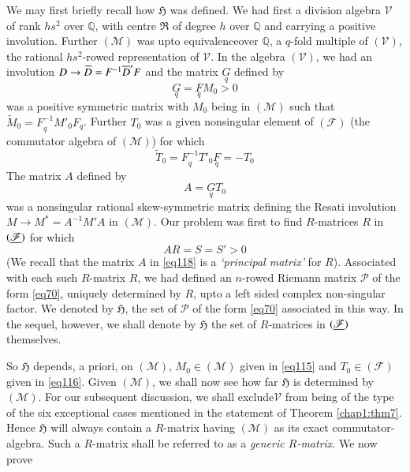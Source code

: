 We may first briefly recall how $\mathfrak{H}$ was defined. We had
first a division algebra $\mathscr{V}$ of rank $hs^{2}$ over
$\mathbb{Q}$,  with centre $\mathfrak{R}$ of degree $h$ over
$\mathbb{Q}$ and carrying a positive involution. Further
$(\mathscr{M})$ was upto equivalence\pageoriginale over $\mathbb{Q}$,
a $q$-fold multiple of $(\mathscr{V})$, the rational $hs^{2}$-rowed
representation of $\mathscr{V}$. In the algebra $(\mathscr{V})$, we
had an involution $D\to \widetilde{D}=F^{-1}\overline{D}'F$ and the matrix
$\underset{q}{G}$ defined by
\begin{equation*}
\underset{q}{G}=\underset{q}{F}M_{0}>0\tag{115}\label{eq115}
\end{equation*}
was a positive symmetric matrix with $M_{0}$ being in $(\mathscr{M})$
such that $\widetilde{M}_{0}=\underset{q}{F^{-1}}M'_{0}F_{q}$. Further
$T_{0}$ was a given nonsingular element of $(\mathscr{F})$ (the
commutator algebra of $(\mathscr{M})$) for which
\begin{equation*}
\widetilde{T}_{0}=\underset{q}{F^{-1}}T'_{0}\underset{q}{F}=-T_{0}\tag{116}\label{eq116} 
\end{equation*}
The matrix $A$ defined by
\begin{equation*}
A=\underset{q}{G}T_{0}\tag{117}\label{eq117}
\end{equation*}
was a nonsingular rational skew-symmetric matrix defining the Resati
involution $M\to M^{\ast}=A^{-1}M'A$ in $(\mathscr{M})$. Our problem
was first to find $R$-matrices $R$ in $(\underline{\mathscr{F}})$ for which
\begin{equation*}
AR=S=S'>0\tag{118}\label{eq118}
\end{equation*}
(We recall that the matrix $A$ in \eqref{eq118} is a {\em `principal
  matrix'} for $R$). Associated with each such $R$-matrix $R$, we had
defined an $n$-rowed Riemann matrix $\mathscr{P}$ of the form
\eqref{eq70}, uniquely determined by $R$, upto a left sided complex
non-singular factor. We denoted by $\mathfrak{H}$, the set of
$\mathscr{P}$ of the form \eqref{eq70} associated in this way. In the
sequel, however, we shall denote by $\mathfrak{H}$ the set of
$R$-matrices in $(\underline{\mathscr{F}})$ themselves. 

So $\mathfrak{H}$ depends, a priori, on $(\mathscr{M})$,
$M_{0}\in(\mathscr{M})$ given in \eqref{eq115} and
$T_{0}\in(\mathscr{F})$ given in \eqref{eq116}. Given $(\mathscr{M})$,
we shall now see how far $\mathfrak{H}$ is determined by
$(\mathscr{M})$. For our 
subsequent discussion, we shall exclude\pageoriginale $\mathscr{V}$
from being of the type of the six exceptional cases mentioned in the
statement of Theorem \ref{chap1:thm7}. Hence $\mathfrak{H}$ will always
contain a $R$-matrix having $(\mathscr{M})$ as its exact
commutator-algebra. Such a $R$-matrix shall be referred to as a {\em
  generic $R$-matrix}. We now prove

